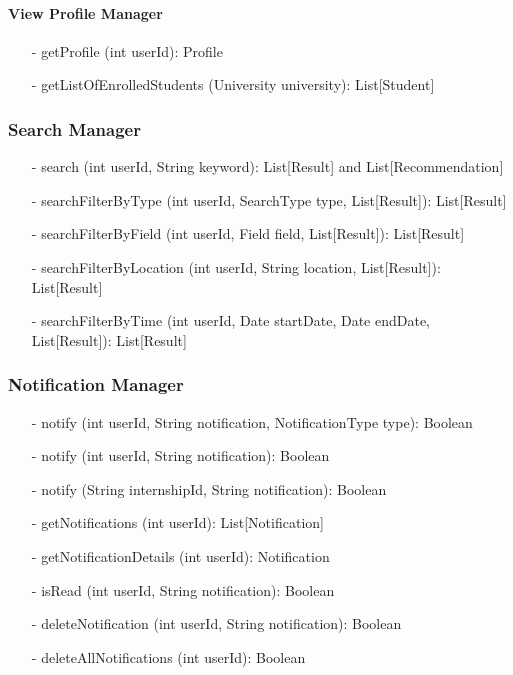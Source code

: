 \paragraph{View Profile Manager}
\begin{itemize}
    \item[-] getProfile (int userId): Profile
    \item[-] getListOfEnrolledStudents (University university): List[Student]
\end{itemize}


\subsubsection{Search Manager}
\begin{itemize}
    \item[-] search (int userId, String keyword): List[Result] and List[Recommendation]
    \item[-] searchFilterByType (int userId, SearchType type, List[Result]): List[Result]
    \item[-] searchFilterByField (int userId, Field field, List[Result]): List[Result]
    \item[-] searchFilterByLocation (int userId, String location, List[Result]): List[Result]
    \item[-] searchFilterByTime (int userId, Date startDate, Date endDate, List[Result]): List[Result]
\end{itemize}


\subsubsection{Notification Manager}
\begin{itemize}
    \item[-] notify (int userId, String notification, NotificationType type): Boolean 
    \item[-] notify (int userId, String notification): Boolean 
    \item[-] notify (String internshipId, String notification): Boolean
    \item[-] getNotifications (int userId): List[Notification]
    \item[-] getNotificationDetails (int userId): Notification
    \item[-] isRead (int userId, String notification): Boolean
    \item[-] deleteNotification (int userId, String notification): Boolean
    \item[-] deleteAllNotifications (int userId): Boolean
\end{itemize}


